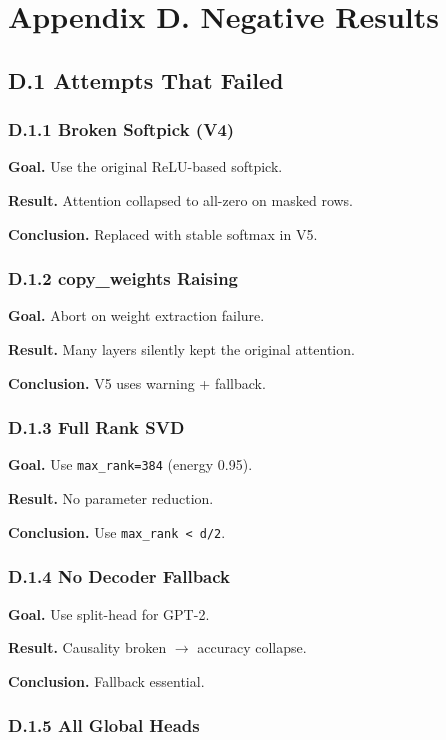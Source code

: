 \section{Appendix D. Negative Results}

\subsection{D.1 Attempts That Failed}

\subsubsection{D.1.1 Broken Softpick (V4)}

\textbf{Goal.} Use the original ReLU-based softpick.

\textbf{Result.} Attention collapsed to all-zero on masked rows.

\textbf{Conclusion.} Replaced with stable softmax in V5.

\subsubsection{D.1.2 copy\_weights Raising}

\textbf{Goal.} Abort on weight extraction failure.

\textbf{Result.} Many layers silently kept the original attention.

\textbf{Conclusion.} V5 uses warning + fallback.

\subsubsection{D.1.3 Full Rank SVD}

\textbf{Goal.} Use \texttt{max\_rank=384} (energy 0.95).

\textbf{Result.} No parameter reduction.

\textbf{Conclusion.} Use \texttt{max\_rank < d/2}.

\subsubsection{D.1.4 No Decoder Fallback}

\textbf{Goal.} Use split-head for GPT-2.

\textbf{Result.} Causality broken $\to$ accuracy collapse.

\textbf{Conclusion.} Fallback essential.

\subsubsection{D.1.5 All Global Heads}

